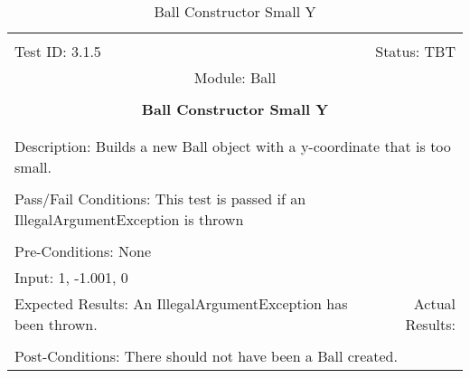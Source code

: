 \documentclass[titlepage]{article}
\begin{document}
\begin{center}%
\begin{table}
\begin{tabular}{|l r|}\hline&\\[-2mm]
	Test ID: 3.1.5	&Status: TBT\\[-3mm]
	\multicolumn{2}{|c|}{Module: Ball}\\&\\
	\multicolumn{2}{|c|}{\textbf{\large{Ball Constructor Small Y}}}\\&\\\hline&\\[-3mm]
	\multicolumn{2}{|p{\textwidth}|}{Description: Builds a new Ball object with a y-coordinate that is too small.}\\[1mm]\hline&\\[-3mm]
	\multicolumn{2}{|p{\textwidth}|}{Pass/Fail Conditions: This test is passed if an IllegalArgumentException is thrown}\\[1mm]\hline&\\[-3mm]
	\multicolumn{2}{|p{\textwidth}|}{Pre-Conditions: None}\\[4mm]
	\multicolumn{2}{|p{\textwidth}|}{Input: 1, -1.001, 0}\\[2mm]\hline
	\multicolumn{1}{|p{0.49\textwidth}}{Expected Results: An IllegalArgumentException has been thrown.}	&\multicolumn{1}{|p{0.45\textwidth}|}{Actual Results:}\\\hline&\\[-3mm]
	\multicolumn{2}{|p{\textwidth}|}{Post-Conditions: There should not have been a Ball created.}\\\hline
\end{tabular}
\caption{Ball Constructor Small Y}
\end{table}
\end{center}
\end{document}
